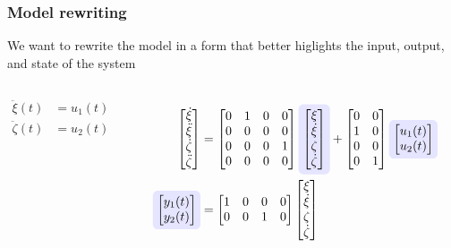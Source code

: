 \begin{frame} 
    \frametitle{Model rewriting}
	We want to rewrite the model in a form that better higlights the input, output, and state of the system
    \begin{columns}[onlytextwidth]
        \begin{align*}
        \ddot{\xi}(t)& = u_1(t) \\
        \ddot{\zeta}(t)& = u_2(t)
        \end{align*}
        \vspace*{2em}
        \begin{center}
        \end{center}
        \vspace*{1em}
        \begin{align*}
        \mat{\dot{\xi}\\\ddot{\xi}\\\dot{\zeta}\\\ddot{\zeta}} 
        &=
        \mat{0&1&0&0\\0&0&0&0\\0&0&0&1\\0&0&0&0}
        \tikz[baseline]{
            \node[fill=blue!10,anchor=base,rounded corners] (state)
            {$\mat{{\xi}\\\dot{\xi}\\{\zeta}\\\dot{\zeta}}$};
        }
        + 
        \mat{0&0\\1 &0\\0&0 \\0&1} 
        \tikz[baseline]{
            \node[fill=blue!10,anchor=base,rounded corners] (input)
            {$\mat{u_1(t)\\u_2(t)}$};
        }\\
        \tikz[baseline]{
            \node[fill=blue!10,anchor=base,rounded corners] (output)
            {$\mat{y_1(t)\\y_2(t)}$};
        }
        &=\mat{1&0&0&0\\0&0&1&0}\mat{\xi\\\dot{\xi}\\{\zeta}\\\dot{\zeta}}
        \end{align*}
        

\end{columns}
\end{frame}
